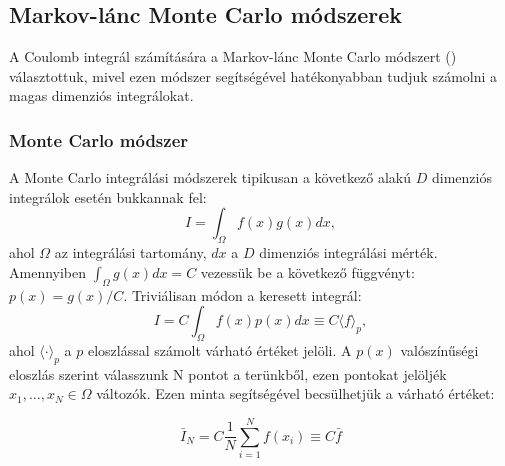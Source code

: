 \documentclass[11pt,a4paper]{article}
\numberwithin{equation}{subsection}
\numberwithin{figure}{section}
\begin{document}
\subsection{Markov-lánc Monte Carlo módszerek}

A Coulomb integrál számítására a Markov-lánc Monte Carlo módszert (\cite{mcbook}) választottuk, mivel ezen módszer segítségével hatékonyabban tudjuk számolni a magas dimenziós integrálokat.

\subsubsection{Monte Carlo módszer}

A Monte Carlo integrálási módszerek tipikusan a következő alakú  $D$ dimenziós integrálok esetén bukkannak fel:
\begin{equation}
I=\int_\Omega f(x)g(x) dx,
\end{equation}
ahol $\Omega$ az integrálási tartomány, $dx$ a $D$ dimenziós integrálási mérték. Amennyiben $\int_\Omega g(x)dx = C$ vezessük be a következő függvényt: $p(x)=g(x)/C$. Triviálisan módon a keresett integrál: 
\begin{equation}
I=C\int_\Omega f(x)p(x)dx \equiv C\langle f \rangle_p,
\end{equation}
ahol  $\langle \cdot \rangle_p$ a $p$ eloszlással számolt várható értéket jelöli.
A $p(x)$ valószínűségi eloszlás szerint válasszunk N pontot a terünkből, ezen pontokat jelöljék $x_1,\dots,x_N\in\Omega$ változók. Ezen minta segítségével becsülhetjük a várható értéket:

\begin{equation}
\bar{I}_N = C\frac{1}{N}\sum_{i=1}^N f(x_i)\equiv C\bar{f}
\label{eq:IN}
\end{equation} 
\end{document}
